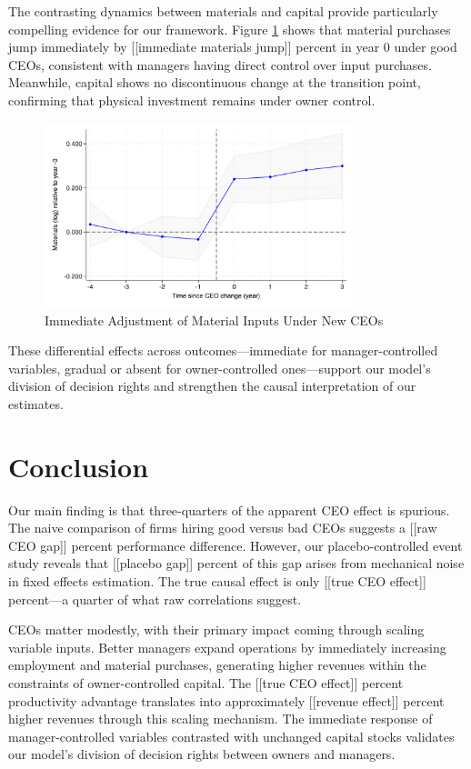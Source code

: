 \documentclass[11pt,a4paper]{article}
\begin{document}
The contrasting dynamics between materials and capital provide particularly compelling evidence for our framework. Figure \ref{fig:materials} shows that material purchases jump immediately by [[immediate materials jump]] percent in year 0 under good CEOs, consistent with managers having direct control over input purchases. Meanwhile, capital shows no discontinuous change at the transition point, confirming that physical investment remains under owner control.

\begin{figure}[htbp]
\centering
\includegraphics[width=0.8\textwidth]{figure/event_study_lnM.pdf}
\caption{Immediate Adjustment of Material Inputs Under New CEOs}
\label{fig:materials}
\end{figure}

These differential effects across outcomes—immediate for manager-controlled variables, gradual or absent for owner-controlled ones—support our model's division of decision rights and strengthen the causal interpretation of our estimates.

\section{Conclusion}

Our main finding is that three-quarters of the apparent CEO effect is spurious. The naive comparison of firms hiring good versus bad CEOs suggests a [[raw CEO gap]] percent performance difference. However, our placebo-controlled event study reveals that [[placebo gap]] percent of this gap arises from mechanical noise in fixed effects estimation. The true causal effect is only [[true CEO effect]] percent—a quarter of what raw correlations suggest.

CEOs matter modestly, with their primary impact coming through scaling variable inputs. Better managers expand operations by immediately increasing employment and material purchases, generating higher revenues within the constraints of owner-controlled capital. The [[true CEO effect]] percent productivity advantage translates into approximately [[revenue effect]] percent higher revenues through this scaling mechanism. The immediate response of manager-controlled variables contrasted with unchanged capital stocks validates our model's division of decision rights between owners and managers.
\end{document}
